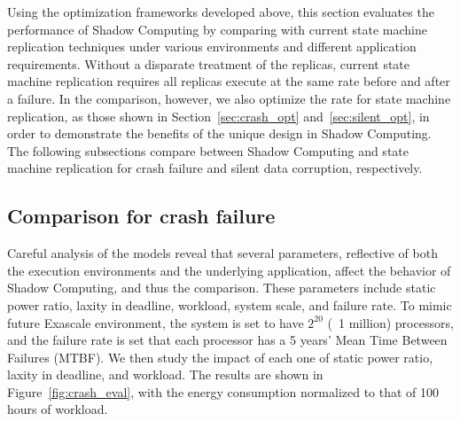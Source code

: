 Using the optimization frameworks developed above, this section evaluates the performance of Shadow Computing by comparing with current state machine replication techniques under various environments and different application requirements. Without a disparate treatment of the replicas, current state machine replication requires all replicas execute at the same rate before and after a failure. In the comparison, however, we also optimize the rate for state machine replication, as those shown in Section~\ref{sec:crash_opt} and~\ref{sec:silent_opt}, in order to demonstrate the benefits of the unique design in Shadow Computing. The following subsections compare between Shadow Computing and state machine replication for crash failure and silent data corruption, respectively. 

\subsection{Comparison for crash failure}
Careful analysis of the models reveal that several parameters, reflective of both the execution environments and the underlying application, affect the behavior of Shadow Computing, and thus the comparison. These parameters include static power ratio, laxity in deadline, workload, system scale, and failure rate. To mimic future Exascale environment, the system is set to have $2^{20}$ (~1 million) processors, and the failure rate is set that each processor has a 5 years' Mean Time Between Failures (MTBF). We then study the impact of each one of static power ratio, laxity in deadline, and workload. The results are shown in Figure~\ref{fig:crash_eval}, with the energy consumption normalized to that of 100 hours of workload.

